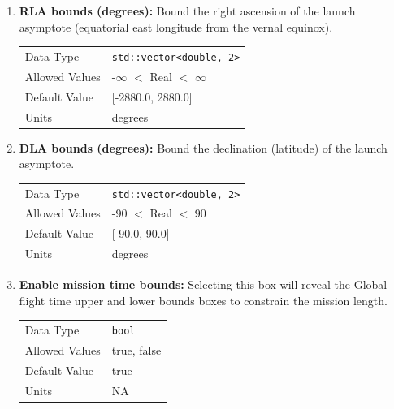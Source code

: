 \begin{enumerate}
    \item \textbf{RLA bounds (degrees):} Bound the right ascension of the launch asymptote (equatorial east longitude from the vernal equinox).

        \begin{table}[H]
            \hspace{2cm}
            \begin{tabular}{ll}
            Data Type & \verb|std::vector<double, 2>| \\
            Allowed Values & -$\infty$ $<$ Real $<$ $\infty$ \\
            Default Value & [-2880.0, 2880.0] \\
            Units & degrees
            \end{tabular}
        \end{table}

    \item \textbf{\acs{DLA} bounds (degrees):} Bound the declination (latitude) of the launch asymptote. 
    
        \begin{table}[H]
            \hspace{2cm}
            \begin{tabular}{ll}
            Data Type & \verb|std::vector<double, 2>| \\
            Allowed Values & -90 $<$ Real $<$ 90 \\
            Default Value & [-90.0, 90.0] \\
            Units & degrees
            \end{tabular}
        \end{table}

    \item \textbf{Enable mission time bounds:} Selecting this box will reveal the Global flight time upper and lower bounds boxes to constrain the mission length.
    
        \begin{table}[H]
            \hspace{2cm}
            \begin{tabular}{ll}
            Data Type & \verb|bool| \\
            Allowed Values & true, false \\
            Default Value & true \\
            Units & NA
            \end{tabular}
        \end{table}


\end{enumerate}
